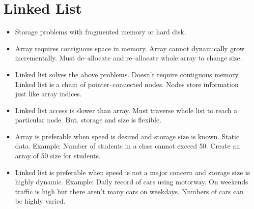 \documentclass[12pt,a4paper]{article}
\begin{document}
\section{Linked List}
\begin{itemize}
\item Storage problems with fragmented memory or hard disk.
\item Array requires contiguous space in memory. Array cannot dynamically grow incrementally. Must de--allocate and re--allocate whole array to change size.
\item Linked list solves the above problems. Doesn't require contiguous memory. Linked list is a chain of pointer--connected nodes. Nodes store information just like array indices.
\item Linked list access is slower than array. Must traverse whole list to reach a particular node. But, storage and size is flexible.
\item Array is preferable when speed is desired and storage size is known. Static data. Example: Number of students in a class cannot exceed 50. Create an array of 50 size for students.
\item Linked list is preferable when speed is not a major concern and storage size is highly dynamic. Example: Daily record of cars using motorway. On weekends traffic is high but there aren't many cars on weekdays. Numbers of cars can be highly varied.
\end{itemize}
%
%
\end{document}
